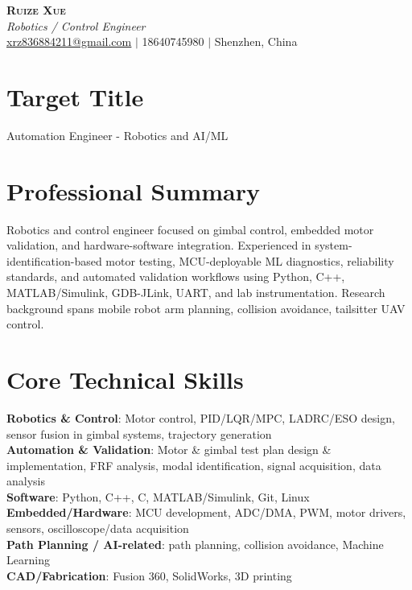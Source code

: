 \documentclass[letterpaper,11pt]{article}
\begin{document}
\begin{center}
    \textbf{\Huge \scshape Ruize Xue} \\ \vspace{1pt}
    \small \textit{Robotics / Control Engineer} \\
    \href{mailto:xrz836884211@gmail.com}{\underline{xrz836884211@gmail.com}} $|$
    18640745980 $|$
    Shenzhen, China
\end{center}

\section{Target Title}
\small{Automation Engineer - Robotics and AI/ML}

\section{Professional Summary}
\small{
Robotics and control engineer focused on gimbal control, embedded motor validation, and hardware-software integration. Experienced in system-identification-based motor testing, MCU-deployable ML diagnostics, reliability standards, and automated validation workflows using Python, C++, MATLAB/Simulink, GDB-JLink, UART, and lab instrumentation. Research background spans mobile robot arm planning, collision avoidance, tailsitter UAV control.
}

\section{Core Technical Skills}
 \begin{itemize}[leftmargin=0.15in, label={}]
    \small{\item{
     \textbf{Robotics \& Control}{: Motor control, PID/LQR/MPC, LADRC/ESO design, sensor fusion in gimbal systems, trajectory generation} \\
     \textbf{Automation \& Validation}{: Motor \& gimbal test plan design \& implementation, FRF analysis, modal identification, signal acquisition, data analysis} \\
     \textbf{Software}{: Python, C++, C, MATLAB/Simulink, Git, Linux} \\
     \textbf{Embedded/Hardware}{: MCU development, ADC/DMA, PWM, motor drivers, sensors, oscilloscope/data acquisition} \\
     \textbf{Path Planning / AI-related}{: path planning, collision avoidance, Machine Learning} \\
     \textbf{CAD/Fabrication}{: Fusion 360, SolidWorks, 3D printing}
    }}
 \end{itemize}
\end{document}
